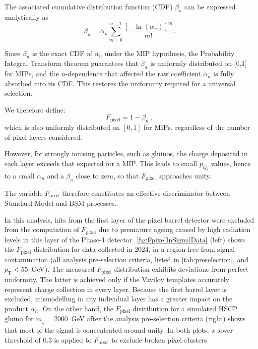 The associated cumulative distribution function (CDF) $\beta_n$ can be expressed analytically as
\begin{equation}
\beta_n = \alpha_n \sum_{m=0}^{n-1} \frac{\left[-\ln(\alpha_n)\right]^m}{m!}.
\end{equation}

\vspace{0.5 cm}

Since $\beta_n$ is the exact CDF of $\alpha_n$ under the MIP hypothesis, the Probability Integral Transform theorem guarantees that $\beta_n$ is uniformly distributed on [0,1] for MIPs, and the $n$-dependence that affected the raw coefficient $\alpha_n$ is fully absorbed into its CDF. This restores the uniformity required for a universal selection.

We therefore define:
\begin{equation}
    F_{\text{pixel}} = 1 - \beta_n \, ,
\end{equation}
which is also uniformly distributed on $[0,1]$ for MIPs, regardless of the number of pixel layers considered.

However, for strongly ionising particles, such as gluinos, the charge deposited in each layer exceeds that expected for a MIP. This leads to small $p_{Q_i}$ values, hence to a small $\alpha_n$ and a $\beta_n$ close to zero, so that $F_{\text{pixel}}$ approaches unity.

The variable $F_{\text{pixel}}$ therefore constitutes an effective discriminator between Standard Model and BSM processes.

\vspace{0.5 cm}

In this analysis, hits from the first layer of the pixel barrel detector were excluded from the computation of $F_{\text{pixel}}$ due to premature ageing caused by high radiation levels in this layer of the Phase-1 detector. \cref{fig:FpixelInSignalData} (left) shows the $F_{\text{pixel}}$ distribution for data collected in 2024, in a region free from signal contamination (all analysis pre-selection criteria, listed in \cref{tab:preselection}, and $p_{\mathrm{T}} < 55$~GeV). The measured $F_{\text{pixel}}$ distribution exhibits deviations from perfect uniformity. The latter is achieved only if the Vavilov templates accurately represent charge collection in every layer. Because the first barrel layer is excluded, mismodelling in any individual layer has a greater impact on the product $\alpha_n$. On the other hand, the $F_{\text{pixel}}$ distribution for a simulated HSCP gluino for $m_{\tilde{g}}=2000$~GeV after the analysis pre-selection criteria (right) shows that most of the signal is concentrated around unity. In both plots, a lower threshold of 0.3 is applied to $F_\textrm{pixel}$ to exclude broken pixel clusters.

